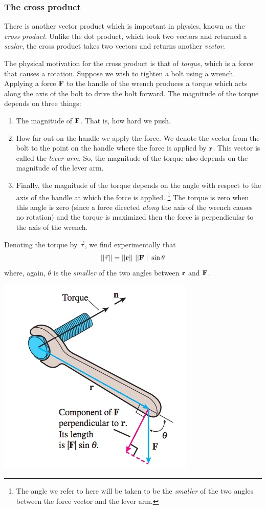 \documentclass[12pt,letterpaper,reqno]{article}
\numberwithin{equation}{section}
\newcommand{\ti}[1]{\textit{#1}}
\begin{document}
\subsubsection{The cross product}
There is another vector product which is important in physics, known as the \ti{cross product}. Unlike the dot product, which took two vectors and returned a \ti{scalar}, the cross product takes two vectors and returns another \ti{vector}.

The physical motivation for the cross product is that of \ti{torque}, which is a force that causes a rotation. Suppose we wish to tighten a bolt using a wrench. Applying a force ${\bf F}$ to the handle of the wrench produces a torque which acts along the axis of the bolt to drive the bolt forward. The magnitude of the torque depends on three things:
\begin{enumerate}
	\item The magnitude of ${\bf F}$. That is, how hard we push.
	\item How far out on the handle we apply the force. We denote the vector from the bolt to the point on the handle where the force is applied by ${\bf r}$. This vector is called the \ti{lever arm}. So, the magnitude of the torque also depends on the magnitude of the lever arm.
	\item Finally, the magnitude of the torque depends on the angle with respect to the axis of the handle at which the force is applied. \footnote{The angle we refer to here will be taken to be the \ti{smaller} of the two angles between the force vector and the lever arm.} The torque is zero when this angle is zero (since a force directed \ti{along} the axis of the wrench causes no rotation) and the torque is maximized then the force is perpendicular to the axis of the wrench.
\end{enumerate}
Denoting the torque by $\vec{\tau}$, we find experimentally that 
\begin{equation}\label{eq:magnitude_of_torque}
	||\vec{\tau}||=||{\bf r}||\ ||{\bf F}||\ \sin \theta
\end{equation}
where, again, $\theta$ is the \ti{smaller} of the two angles between ${\bf r}$ and ${\bf F}$.
\begin{center}
	\includegraphics[scale=0.5]{figures_mvc/torque_wrench}
\end{center}
\end{document}
